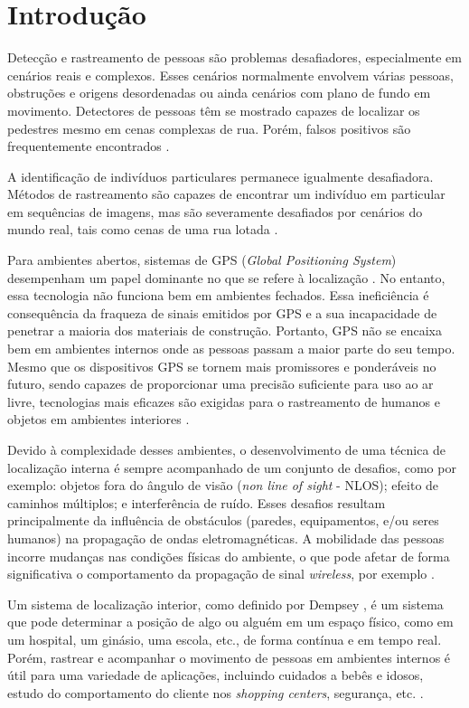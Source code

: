 \section{Introdução}\label{sec:introducao}

Detecção e rastreamento de pessoas são problemas desafiadores, especialmente em cenários reais e complexos. Esses cenários normalmente envolvem várias pessoas, obstruções e origens desordenadas ou ainda cenários com plano de fundo em movimento. Detectores de pessoas têm se mostrado capazes de localizar os pedestres mesmo em cenas complexas de rua. Porém, falsos positivos são frequentemente encontrados \cite{andriluka2008people}. 

A identificação de indivíduos particulares permanece igualmente desafiadora.
Métodos de rastreamento são capazes de encontrar um indivíduo em particular em sequências de imagens, mas são severamente desafiados por cenários do mundo real, tais como cenas de uma rua lotada \cite{andriluka2008people}.

Para ambientes abertos, sistemas de GPS (\textit{Global Positioning System}) desempenham um papel dominante no que se refere à localização \cite{fritsche2009}. No entanto, essa tecnologia não funciona bem em ambientes fechados. Essa ineficiência é consequência da fraqueza de sinais emitidos por GPS e a sua incapacidade de penetrar a maioria dos materiais de construção. Portanto, GPS não se encaixa bem em ambientes internos onde as pessoas passam a maior parte do seu tempo. Mesmo que os dispositivos GPS se tornem mais promissores e ponderáveis no futuro, sendo capazes de proporcionar uma precisão suficiente para uso ao ar livre, tecnologias mais eficazes são exigidas para o rastreamento de humanos e objetos em ambientes interiores \cite{zhang2010localization}.

Devido à complexidade desses ambientes, o desenvolvimento de uma técnica de localização interna é sempre acompanhado de um conjunto de desafios, como por exemplo: objetos fora do ângulo de visão (\textit{non line of sight} - NLOS); efeito de caminhos múltiplos; e interferência de ruído. Esses desafios resultam principalmente da influência de obstáculos (paredes, equipamentos, e/ou seres humanos) na propagação de ondas eletromagnéticas. A mobilidade das pessoas incorre mudanças nas condições físicas do ambiente, o que pode afetar de forma significativa o comportamento da propagação de sinal \textit{wireless}, por exemplo \cite{zhang2010localization}. 

Um sistema de localização interior, como definido por Dempsey \cite{dempsey2003indoor}, é um sistema que pode determinar a posição de algo ou alguém em um espaço físico, como em um hospital, um ginásio, uma escola, etc., de forma contínua e em tempo real. Porém, rastrear e acompanhar o movimento de pessoas em ambientes internos é útil para uma variedade de aplicações, incluindo cuidados a bebês e idosos, estudo do comportamento do cliente nos \textit{shopping centers}, segurança, etc. \cite{yiu2007tracking}.

